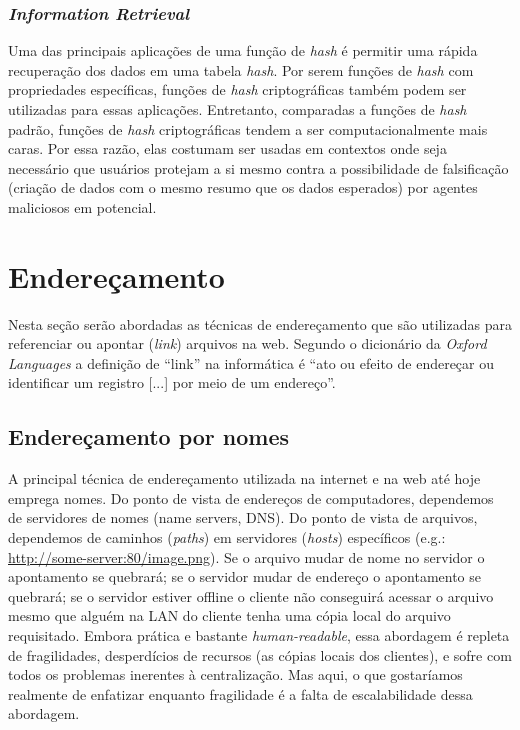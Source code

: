 \subsubsection{\textit{Information Retrieval}}

Uma das principais aplicações de uma função de \textit{hash} é permitir uma rápida recuperação dos dados em uma tabela \textit{hash}.
Por serem funções de \textit{hash} com propriedades específicas, funções de \textit{hash} criptográficas também podem ser utilizadas para essas aplicações.
Entretanto, comparadas a funções de \textit{hash} padrão, funções de \textit{hash} criptográficas tendem a ser computacionalmente mais caras.
Por essa razão, elas costumam ser usadas em contextos onde seja necessário que usuários protejam a si mesmo contra a possibilidade de falsificação (criação de dados com o mesmo resumo que os dados esperados) por agentes maliciosos em potencial.

\section{Endereçamento}

Nesta seção serão abordadas as técnicas de endereçamento que são utilizadas para referenciar ou apontar (\textit{link}) arquivos na web.
Segundo o dicionário da \textit{Oxford Languages} a definição de ``link'' na informática é ``ato ou efeito de endereçar ou identificar um registro [...] por meio de um endereço''.

\subsection{Endereçamento por nomes}

A principal técnica de endereçamento utilizada na internet e na web até hoje emprega nomes.
Do ponto de vista de endereços de computadores, dependemos de servidores de nomes (name servers, DNS).
Do ponto de vista de arquivos, dependemos de caminhos (\textit{paths}) em servidores (\textit{hosts}) específicos (e.g.: \url{http://some-server:80/image.png}).
Se o arquivo mudar de nome no servidor o apontamento se quebrará; se o servidor mudar de endereço o apontamento se quebrará; se o servidor estiver offline o cliente não conseguirá acessar o arquivo mesmo que alguém na LAN do cliente tenha uma cópia local do arquivo requisitado.
Embora prática e bastante \textit{human-readable}, essa abordagem é repleta de fragilidades, desperdícios de recursos (as cópias locais dos clientes), e sofre com todos os problemas inerentes à centralização.
Mas aqui, o que gostaríamos realmente de enfatizar enquanto fragilidade é a falta de escalabilidade dessa abordagem.


